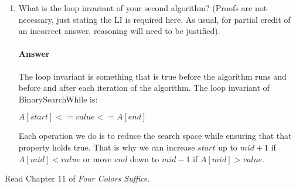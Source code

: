 \documentclass{article}
\begin{document}
\begin{enumerate}
    \item What is the loop invariant of your second algorithm? (Proofs are not
        necessary, just stating the LI is required here.  As usual, for partial
        credit of an incorrect answer, reasoning will need to be justified).

        \paragraph{Answer}

        The loop invariant is something that is true before the algorithm runs and before and after each iteration of the algorithm. The loop invariant of BinarySearchWhile is:
        
        $A[start] <= value <= A[end]$
        
        Each operation we do is to reduce the search space while ensuring that that property holds true. That is why we can increase 
        $start$ up to $mid+1$ if $A[mid] < value$ or move $end$ down to $mid-1$ if $A[mid] > value$.
\end{enumerate}

 

Read Chapter $11$ of \emph{Four Colors Suffice}.
\end{document}
